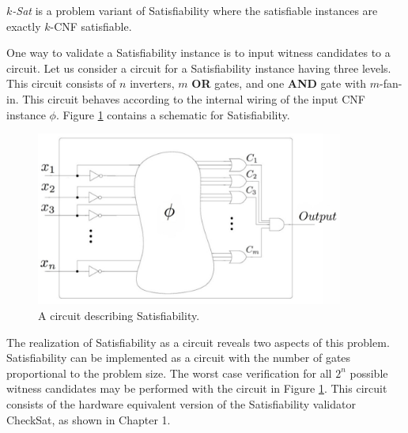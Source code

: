 \begin{definition}
\emph{$k$-{\sc Sat}} is a problem variant of {\sc Satisfiability} where the satisfiable instances are exactly $k$-CNF satisfiable.
\end{definition}


One way to validate a {\sc Satisfiability} instance is to input witness candidates to a circuit.  Let us consider a circuit for a {\sc Satisfiability} instance having three levels.  This circuit consists of $n$ inverters, $m$ \textbf{OR} gates, and one \textbf{AND} gate with $m$-fan-in.  This circuit behaves according to the internal wiring of the input CNF instance $\phi$. Figure \ref{blackBoxSat} contains a schematic for {\sc Satisfiability}.	

\begin{figure}[htbp]
\begin{center}

	\includegraphics[width=0.9\textwidth]{figures/circuitLabeled.jpg}

\caption{A circuit describing {\sc Satisfiability}.}
\label{blackBoxSat}
\end{center}
\end{figure}
	
\FloatBarrier

The realization of {\sc Satisfiability} as a circuit reveals two aspects of this problem.  {\sc Satisfiability} can be implemented as a circuit with the number of gates proportional to the problem size.  The worst case verification for all $2^n$ possible witness candidates may be performed with the circuit in Figure \ref{blackBoxSat}.  This circuit consists of the hardware equivalent version of the {\sc Satisfiability} validator {\sc CheckSat}, as shown in Chapter 1.  
	
